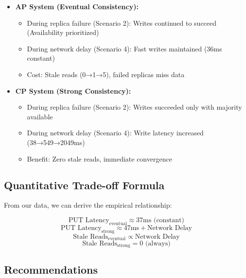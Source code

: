 \documentclass[10pt,a4paper]{article}
\begin{document}
\begin{itemize}
    \item \textbf{AP System (Eventual Consistency):}
    \begin{itemize}
        \item During replica failure (Scenario 2): Writes continued to succeed (Availability prioritized)
        \item During network delay (Scenario 4): Fast writes maintained (36ms constant)
        \item Cost: Stale reads (0→1→5), failed replicas miss data
    \end{itemize}
    
    \item \textbf{CP System (Strong Consistency):}
    \begin{itemize}
        \item During replica failure (Scenario 2): Writes succeeded only with majority available
        \item During network delay (Scenario 4): Write latency increased (38→549→2049ms)
        \item Benefit: Zero stale reads, immediate convergence
    \end{itemize}
\end{itemize}

\subsection{Quantitative Trade-off Formula}

From our data, we can derive the empirical relationship:

\begin{equation}
\text{PUT Latency}_{\text{eventual}} \approx 37\text{ms (constant)}
\end{equation}
\begin{equation}
\text{PUT Latency}_{\text{strong}} \approx 47\text{ms} + \text{Network Delay}
\end{equation}
\begin{equation}
\text{Stale Reads}_{\text{eventual}} \propto \text{Network Delay}
\end{equation}
\begin{equation}
\text{Stale Reads}_{\text{strong}} = 0 \text{ (always)}
\end{equation}

\subsection{Recommendations}
\end{document}
